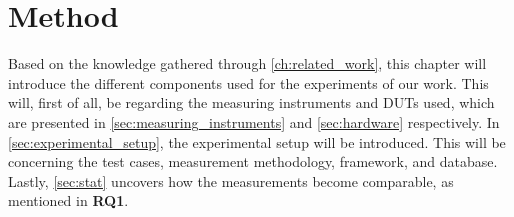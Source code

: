 \chapter{Method}\label{ch:method}

Based on the knowledge gathered through \cref{ch:related_work}, this chapter will introduce the different components used for the experiments of our work. This will, first of all, be regarding the measuring instruments and DUTs used, which are presented in \cref{sec:measuring_instruments} and \cref{sec:hardware} respectively. In \cref{sec:experimental_setup}, the experimental setup will be introduced. This will be concerning the test cases, measurement methodology, framework, and database. Lastly, \cref{sec:stat} uncovers how the measurements become comparable, as mentioned in \textbf{RQ1}.







% 
% 



